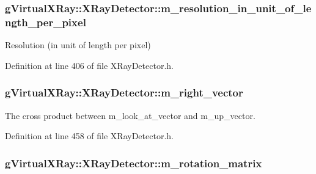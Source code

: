 \hypertarget{classg_virtual_x_ray_1_1_x_ray_detector_a437004cdae0f0b03840c0dce2a0018d0}{
\subsubsection[{m\_\-resolution\_\-in\_\-unit\_\-of\_\-length\_\-per\_\-pixel}]{ {\bf gVirtualXRay::XRayDetector::m\_\-resolution\_\-in\_\-unit\_\-of\_\-length\_\-per\_\-pixel}}}
\label{classg_virtual_x_ray_1_1_x_ray_detector_a437004cdae0f0b03840c0dce2a0018d0}


Resolution (in unit of length per pixel) 



Definition at line 406 of file XRayDetector.h.

\hypertarget{classg_virtual_x_ray_1_1_x_ray_detector_a43c90e61c73da70e02f73929873b443c}{
\subsubsection[{m\_\-right\_\-vector}]{ {\bf gVirtualXRay::XRayDetector::m\_\-right\_\-vector}}}
\label{classg_virtual_x_ray_1_1_x_ray_detector_a43c90e61c73da70e02f73929873b443c}


The cross product between m\_\-look\_\-at\_\-vector and m\_\-up\_\-vector. 



Definition at line 458 of file XRayDetector.h.

\hypertarget{classg_virtual_x_ray_1_1_x_ray_detector_a939ddb2d6fb51e831236ee0ccffc7ec8}{
\subsubsection[{m\_\-rotation\_\-matrix}]{ {\bf gVirtualXRay::XRayDetector::m\_\-rotation\_\-matrix}}}
\label{classg_virtual_x_ray_1_1_x_ray_detector_a939ddb2d6fb51e831236ee0ccffc7ec8}


